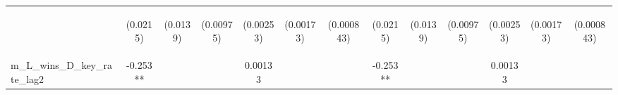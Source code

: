 \documentclass[]{article}
\begin{document}
\begin{center}
\begin{tabular}{lcccccccccccc}
\vspace{4pt} & \begin{footnotesize}(0.0215)\end{footnotesize} & \begin{footnotesize}(0.0139)\end{footnotesize} & \begin{footnotesize}(0.00975)\end{footnotesize} & \begin{footnotesize}(0.00253)\end{footnotesize} & \begin{footnotesize}(0.00173)\end{footnotesize} & \begin{footnotesize}(0.000843)\end{footnotesize} & \begin{footnotesize}(0.0215)\end{footnotesize} & \begin{footnotesize}(0.0139)\end{footnotesize} & \begin{footnotesize}(0.00975)\end{footnotesize} & \begin{footnotesize}(0.00253)\end{footnotesize} & \begin{footnotesize}(0.00173)\end{footnotesize} & \begin{footnotesize}(0.000843)\end{footnotesize} \\
m\_L\_wins\_D\_key\_rate\_lag2 & -0.253** &  &  & 0.00133 &  &  & -0.253** &  &  & 0.00133 &  &  \\

\end{tabular}
\end{center}
\end{document}
